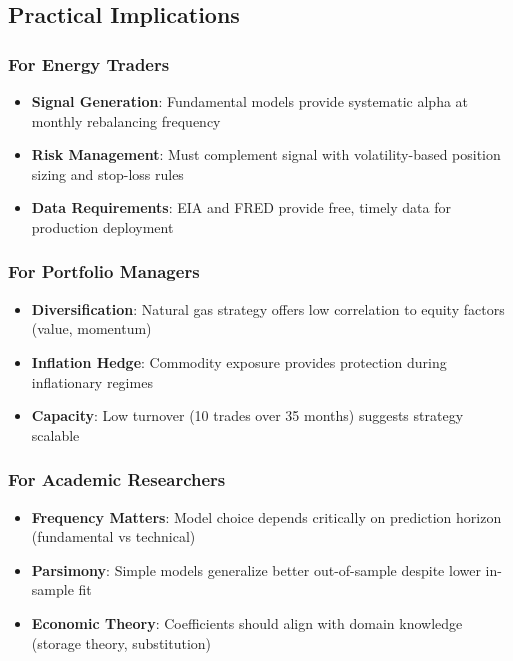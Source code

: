 \documentclass[12pt,a4paper]{article}
\begin{document}
\subsection{Practical Implications}

\subsubsection{For Energy Traders}

\begin{itemize}
    \item \textbf{Signal Generation}: Fundamental models provide systematic alpha at monthly rebalancing frequency

    \item \textbf{Risk Management}: Must complement signal with volatility-based position sizing and stop-loss rules

    \item \textbf{Data Requirements}: EIA and FRED provide free, timely data for production deployment
\end{itemize}

\subsubsection{For Portfolio Managers}

\begin{itemize}
    \item \textbf{Diversification}: Natural gas strategy offers low correlation to equity factors (value, momentum)

    \item \textbf{Inflation Hedge}: Commodity exposure provides protection during inflationary regimes

    \item \textbf{Capacity}: Low turnover (10 trades over 35 months) suggests strategy scalable
\end{itemize}

\subsubsection{For Academic Researchers}

\begin{itemize}
    \item \textbf{Frequency Matters}: Model choice depends critically on prediction horizon (fundamental vs technical)

    \item \textbf{Parsimony}: Simple models generalize better out-of-sample despite lower in-sample fit

    \item \textbf{Economic Theory}: Coefficients should align with domain knowledge (storage theory, substitution)
\end{itemize}
\end{document}
